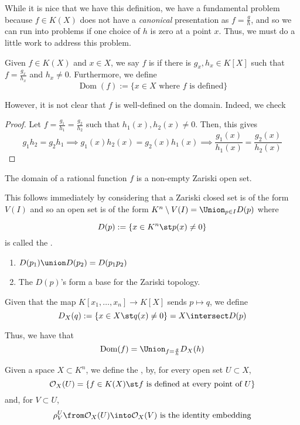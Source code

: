 \documentclass[11pt,leqno,oneside]{amsbook}
\newcommand{\Dom}{\operatorname{Dom}}
\renewcommand{\O}{\mathcal{O}}
\numberwithin{thm}{section}
\begin{document}
While it is nice that we have this definition, we have a fundamental
problem because \(f \in K(X)\) does not have a \emph{canonical}
presentation as \(f = \frac{g}{h}\), and so we can run into problems
if one choice of \(h\) is zero at a point \(x\). Thus, we must do a
little work to 
address this problem.
\begin{defn}
  Given \(f \in K(X)\) and \(x \in X\), we say \(f\) is  if there is \(g_x, h_x \in K[X]\) such that \(f =
  \frac{g_x}{h_x}\) and \(h_x \neq 0\). Furthermore, we define \[
    \Dom(f) := \{x \in X \text{ where }f\text{ is defined}\}
  \]
\end{defn}
However, it is not clear that \(f\) is well-defined on the
domain. Indeed, we check
\begin{proof}
  Let \(f = \frac{g_1}{h_1} = \frac{g_2}{h_2}\) such that \(h_1(x),
  h_2(x) \neq 0\). Then, this gives\[
    g_1 h_2 = g_2 h_1 \implies g_1(x) h_2(x) = g_2(x) h_1(x) \implies
    \frac{g_1(x)}{h_1(x)} = \frac{g_2(x)}{h_2(x)}
  \]
\end{proof}
\begin{prop}
  The domain of a rational function \(f\) is a non-empty Zariski open set.
\end{prop}
This follows immediately by considering that a Zariski closed set is
of the form \(V(I)\) and so an open set is of the form \(K^n \setminus
V(I) = \Union_{p \in I} D(p)\) where
\begin{defn}
  \[
    D(p) := \{x \in K^n \st p(x) \neq 0\}
  \]
  is called the .
\end{defn}
\begin{prop}
  \begin{enumerate}
  \item \(D(p_1) \union D(p_2) = D(p_1 p_2)\)
  \item The \(D(p)\)'s form a base for the Zariski topology.
  \end{enumerate}
\end{prop}
\begin{defn}
  Given that the map \(K[x_1, \ldots, x_n] \to K[X]\) sends \(p
  \mapsto q\), we define \[
    D_X(q) := \{x \in X \st q(x) \neq 0\} = X \intersect D(p)
  \]
\end{defn}
Thus, we have that \[
  \Dom(f) = \Union_{f=\frac{g}{h}} D_X(h)
\]
\begin{defn}
  Given a space \(X \subset K^n\), we define the , by, for every open set \(U \subset X\), \[
    \O_X(U) = \{f \in K(X) \st f \text{ is defined at every point of }U\}
  \]
  and, for \(V \subset U\), \[
    \rho^U_V \from \O_X(U) \into \O_X(V) \text{ is the identity embedding}
  \]
\end{defn}
\end{document}
